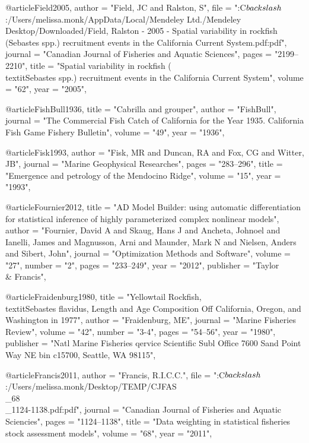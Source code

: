@article{Field2005,
    author = "{Field, JC and Ralston, S}",
    file = "{:C$\\backslash$:/Users/melissa.monk/AppData/Local/Mendeley Ltd./Mendeley Desktop/Downloaded/Field, Ralston - 2005 - Spatial variability in rockfish (Sebastes spp.) recruitment events in the California Current System.pdf:pdf}",
    journal = "{Canadian Journal of Fisheries and Aquatic Sciences}",
    pages = "{2199--2210}",
    title = "{{Spatial variability in rockfish (\\textit{{Sebastes}} spp.) recruitment events in the California Current System}}",
    volume = "{62}",
    year = "{2005}",
}

@article{FishBull1936,
    title = "{Cabrilla and grouper}",
    author = "{FishBull}",
    journal = "{The Commercial Fish Catch of California for the Year 1935. California Fish Game Fishery Bulletin}",
    volume = "{49}",
    year = "{1936}",
}

@article{Fisk1993,
    author = "{Fisk, MR and Duncan, RA and Fox, CG and Witter, JB}",
    journal = "{Marine Geophysical Researches}",
    pages = "{283--296}",
    title = "{{Emergence and petrology of the Mendocino Ridge}}",
    volume = "{15}",
    year = "{1993}",
}

@article{Fournier2012,
    title = "{AD Model Builder: using automatic differentiation for statistical inference of highly parameterized complex nonlinear models}",
    author = "{Fournier, David A and Skaug, Hans J and Ancheta, Johnoel and Ianelli, James and Magnusson, Arni and Maunder, Mark N and Nielsen, Anders and Sibert, John}",
    journal = "{Optimization Methods and Software}",
    volume = "{27}",
    number = "{2}",
    pages = "{233--249}",
    year = "{2012}",
    publisher = "{Taylor \\& Francis}",
}

@article{Fraidenburg1980,
    title = "{Yellowtail Rockfish, \\textit{{{Sebastes}} flavidus}, Length and Age Composition Off California, Oregon, and Washington in 1977}",
    author = "{Fraidenburg, ME}",
    journal = "{Marine Fisheries Review}",
    volume = "{42}",
    number = "{3-4}",
    pages = "{54--56}",
    year = "{1980}",
    publisher = "{Natl Marine Fisheries qervice Scientific Subl Office 7600 Sand Point Way NE bin c15700, Seattle, WA 98115}",
}

@article{Francis2011,
    author = "{Francis, R.I.C.C.}",
    file = "{:C$\\backslash$:/Users/melissa.monk/Desktop/TEMP/CJFAS\\_68\\_1124-1138.pdf:pdf}",
    journal = "{Canadian Journal of Fisheries and Aquatic Sciencies}",
    pages = "{1124--1138}",
    title = "{{Data weighting in statistical fisheries stock assessment models}}",
    volume = "{68}",
    year = "{2011}",
}

